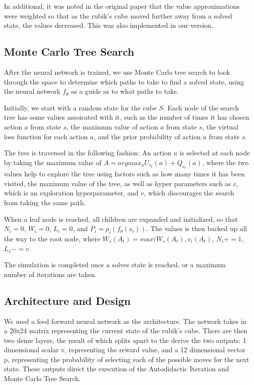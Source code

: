 \documentclass[10pt,twocolumn,letterpaper]{article}
\begin{document}
In additional, it was noted in the original paper that the value approximations were weighted so that as the rubik's cube moved further away from a solved state, the values decreased. This was also implemented in our version.

\subsection{Monte Carlo Tree Search}

After the neural network is trained, we use Monte Carlo tree search to look through the space to determine which paths to take to find a solved state, using the neural network $f_\theta$ as a guide as to what paths to take. 


Initially, we start with a random state for the cube $S$. Each node of the search tree has some values assoicated with it, such as the number of times it has chosen action $a$ from state $s$, the maximum value of action $a$ from state $s$, the virtual loss function for each action $a$, and the prior probability of action $a$ from state $s$.


The tree is traversed in the following fashion: An action $a$ is selected at each node by taking the maximum value of $A=argmax_a U_{s_{t}}(a) + Q_{s_{t}}(a) $, where the two values help to explore the tree using factors such as how many times it has been visited, the maximum value of the tree, as well as hyper parameters such as $c$, which is an exploration hyperparameter, and $v$, which discourages the search from taking the same path.

When a leaf node is reached, all children are expanded and initialized, so that $N_i = 0$, $W_i = 0$, $L_i = 0$, and $P_i = p_i(f_\theta (s_i))$. The values is  then backed up all the way to the root node, where $W_s(A_t) = max(W_s(A_t), v_i(A_t)$, $N_i += 1$, $L_s -= v$.

The simulation is completed once a solves state is reached, or a maximum number of iterations are taken.

\subsection{Architecture and Design}
We used a feed forward neural network as the architecture.  The network takes in a 20x24 matrix representing the current state of the rubik's cube.  There are then two dense layers, the result of which splits apart to the derive the two outputs: 1 dimensional scalar v, representing the reward value, and a 12 dimensional vector p, representing the probability of selecting each of the possible moves for the next state.  These outputs direct the execution of the Autodidactic Iteration and Monte Carlo Tree Search.
\end{document}
